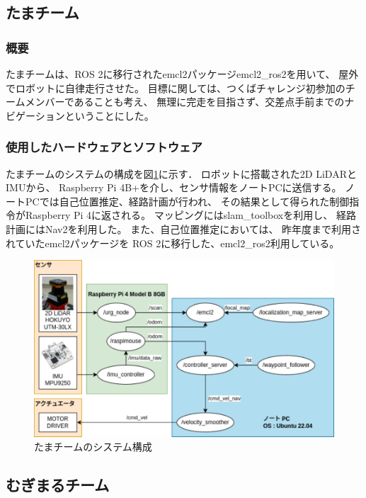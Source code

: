 \documentclass[twocolumn,9pt]{jsproceedings}
\begin{document}
\subsection{たまチーム}\label{sub:localization}
\subsubsection{概要}
たまチームは、ROS 2に移行されたemcl2パッケージemcl2\_ros2を用いて、
屋外でロボットに自律走行させた。
目標に関しては、つくばチャレンジ初参加のチームメンバーであることも考え、
無理に完走を目指さず、交差点手前までのナビゲーションということにした。

\subsubsection{使用したハードウェアとソフトウェア}

たまチームのシステムの構成を図\ref{fig:tama_system_diagram}に示す．
ロボットに搭載された2D LiDARとIMUから、
Raspberry Pi 4B+を介し、センサ情報をノートPCに送信する。
ノートPCでは自己位置推定、経路計画が行われ、
その結果として得られた制御指令がRaspberry Pi 4に返される。
マッピングにはslam\_toolboxを利用し、
経路計画にはNav2を利用した。
また、自己位置推定においては、
昨年度まで利用されていたemcl2パッケージを
ROS 2に移行した、emcl2\_ros2利用している。

\begin{figure}[h]
  \begin{center}
    \includegraphics[width=1.0\linewidth]{figs/tama_system_diagram.pdf}
    \caption{たまチームのシステム構成}
    \label{fig:tama_system_diagram}
  \end{center}
\end{figure}

\subsection{むぎまるチーム}
\end{document}
